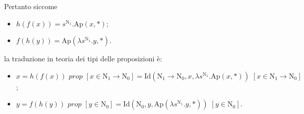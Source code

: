 \documentclass[a4paper]{letter}
\begin{document}
Pertanto siccome
\begin{itemize}
    \item $h(f(x)) = s^{\text{N}_1}.\text{Ap}(x, *)$;
    \item $f(h(y)) = \text{Ap}(\lambda s^{\text{N}_1}.y, *)$.
\end{itemize}

la traduzione in teoria dei tipi delle proposizioni è:
\begin{itemize}
    \item $x = h(f(x))\,\,prop\,\,[x \in \text{N}_1 \rightarrow \text{N}_0] = \text{Id}(\text{N}_1 \rightarrow \text{N}_0, x, \lambda s^{\text{N}_1} . \text{Ap}(x, *))\,\,[x \in \text{N}_1 \rightarrow \text{N}_0]$;
    \item $y = f(h(y))\,\,prop\,\,[y \in \text{N}_0] = \text{Id}(\text{N}_0, y, \text{Ap}(\lambda s^{\text{N}_1} . y, *))\,\,[y \in \text{N}_0]$.
\end{itemize}
\end{document}
